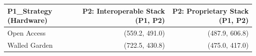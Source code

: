 

\begin{tabular}{@{}lrr@{}}
\toprule
P1\_Strategy (Hardware) & P2: Interoperable Stack (P1, P2) & P2: Proprietary Stack (P1, P2) \\
\midrule
Open Access & (559.2, 491.0) & (487.9, 606.8) \\
Walled Garden & (722.5, 430.8) & (475.0, 417.0) \\
\bottomrule
\end{tabular}